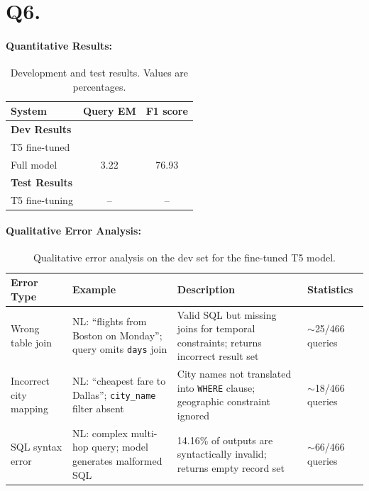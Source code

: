 \documentclass{article}
\begin{document}
\section*{Q6.}
\label{Q6}

\paragraph{Quantitative Results:}
\begin{table}[h!]
\centering
\begin{tabular}{lcc}
  \toprule
  System & Query EM & F1 score \\
  \midrule
  \multicolumn{3}{l}{\textbf{Dev Results}} \\
  \midrule
  \multicolumn{3}{l}{T5 fine-tuned} \\
  Full model & 3.22 & 76.93 \\
  \midrule
  \multicolumn{3}{l}{\textbf{Test Results}} \\
  \midrule
  T5 fine-tuning & -- & -- \\
  \bottomrule
\end{tabular}
\caption{Development and test results. Values are percentages.}
\label{tab:results}
\end{table}

\paragraph{Qualitative Error Analysis:}

\begin{table}[h!]
  \centering
  \small
  \setlength{\tabcolsep}{4pt}
  \begin{tabular}{p{2.0cm}p{3.2cm}p{4.0cm}p{2.8cm}}
    \toprule
    \textbf{Error Type} & \textbf{Example} & \textbf{Description} & \textbf{Statistics} \\
    \midrule
    Wrong table join &
      NL: ``flights from Boston on Monday''; query omits \texttt{days} join &
      Valid SQL but missing joins for temporal constraints; returns incorrect result set &
      $\sim$25/466 queries \\
    \midrule
    Incorrect city mapping &
      NL: ``cheapest fare to Dallas''; \texttt{city\_name} filter absent &
      City names not translated into \texttt{WHERE} clause; geographic constraint ignored &
      $\sim$18/466 queries \\
    \midrule
    SQL syntax error &
      NL: complex multi-hop query; model generates malformed SQL &
      14.16\% of outputs are syntactically invalid; returns empty record set &
      $\sim$66/466 queries \\
    \bottomrule
  \end{tabular}
  \caption{Qualitative error analysis on the dev set for the fine-tuned T5 model.}
  \label{tab:qualitative}
\end{table}
\end{document}
